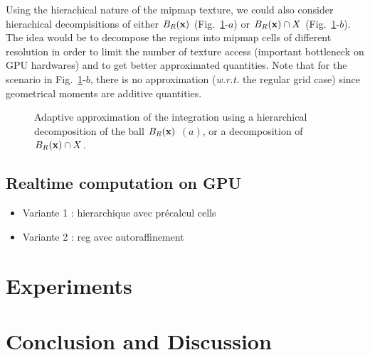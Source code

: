 \documentclass{llncs}
\newcommand{\wrt}{\emph{w.r.t.} }
\begin{document}
{Using the hierachical nature of the mipmap texture, we could also
consider hierachical decompisitions of either $B_R(\mathbf{x})$
(Fig.~\ref{fig:approx2}-$a$) or $B_R(\mathbf{x})\cap X$
(Fig.~\ref{fig:approx2}-$b$). The idea would be to decompose the
regions into mipmap cells of different resolution in order to limit
the number of texture access (important bottleneck on GPU hardwares)
and to get better approximated quantities. Note that for the scenario
in Fig.~\ref{fig:approx2}-$b$, there is no approximation (\wrt the
regular grid case) since  geometrical moments are additive quantities.
\begin{figure}
  \begin{center}
  \end{center}
  \caption{Adaptive approximation of the integration using a
    hierarchical decomposition of the ball $B_R(\mathbf{x})$ $(a)$, or a decomposition of $B_R(\mathbf{x})\cap X$.}
  \label{fig:approx2}
\end{figure}


\subsection{Realtime computation on GPU}
\begin{itemize}
\item   Variante 1 : hierarchique avec précalcul cells
\item   Variante 2 : reg avec autoraffinement
\end{itemize}




\section{Experiments}
\label{sec:experiments}



\section{Conclusion and Discussion}
\label{sec:discussion}



}
\end{document}
